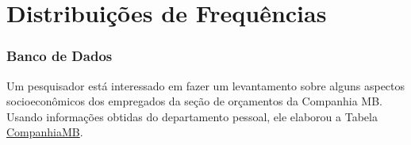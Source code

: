\documentclass[12pt]{beamer}
\begin{document}
\section{Distribuições de Frequências}
\begin{frame}{}
\frametitle{Banco de Dados}
\begin{block}{}
\justifying
Um pesquisador está interessado em fazer um levantamento sobre alguns aspectos socioeconômicos dos empregados da seção de orçamentos da Companhia MB. Usando informações obtidas do departamento pessoal, ele elaborou a Tabela \href{https://raw.githack.com/ufvest/ufvest.github.io/master/Aulas_EST105/CompanhiaMB.html}{CompanhiaMB}.
\end{block}
\end{frame}


\end{document}
